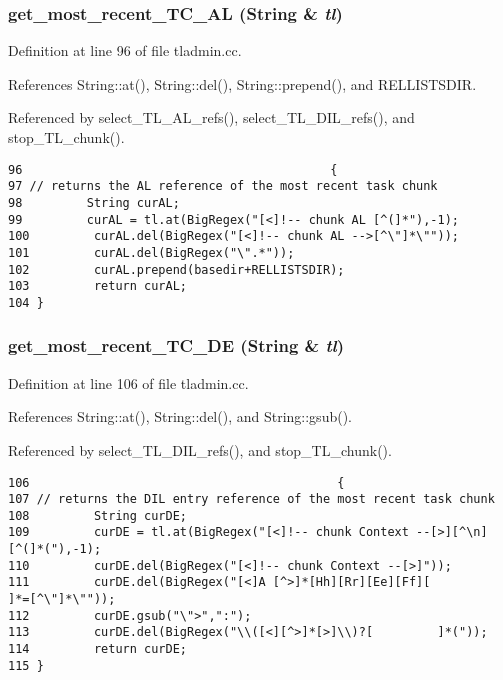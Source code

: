 \subsubsection{ get\_\-most\_\-recent\_\-TC\_\-AL ({\bf String} \& {\em tl})}\label{tladmin_8cc_a4}




Definition at line 96 of file tladmin.cc.

References String::at(), String::del(), String::prepend(), and RELLISTSDIR.

Referenced by select\_\-TL\_\-AL\_\-refs(), select\_\-TL\_\-DIL\_\-refs(), and stop\_\-TL\_\-chunk().



\footnotesize\begin{verbatim}96                                           {
97 // returns the AL reference of the most recent task chunk
98         String curAL;
99         curAL = tl.at(BigRegex("[<]!-- chunk AL [^(]*"),-1);
100         curAL.del(BigRegex("[<]!-- chunk AL -->[^\"]*\""));
101         curAL.del(BigRegex("\".*"));
102         curAL.prepend(basedir+RELLISTSDIR);
103         return curAL;
104 }
\end{verbatim}\normalsize 
{}
\subsubsection{ get\_\-most\_\-recent\_\-TC\_\-DE ({\bf String} \& {\em tl})}\label{tladmin_8cc_a5}




Definition at line 106 of file tladmin.cc.

References String::at(), String::del(), and String::gsub().

Referenced by select\_\-TL\_\-DIL\_\-refs(), and stop\_\-TL\_\-chunk().



\footnotesize\begin{verbatim}106                                           {
107 // returns the DIL entry reference of the most recent task chunk
108         String curDE;
109         curDE = tl.at(BigRegex("[<]!-- chunk Context --[>][^\n][^(]*("),-1);
110         curDE.del(BigRegex("[<]!-- chunk Context --[>]"));
111         curDE.del(BigRegex("[<]A [^>]*[Hh][Rr][Ee][Ff][         ]*=[^\"]*\""));
112         curDE.gsub("\">",":");
113         curDE.del(BigRegex("\\([<][^>]*[>]\\)?[         ]*("));
114         return curDE;
115 }
\end{verbatim}\normalsize 
{}

